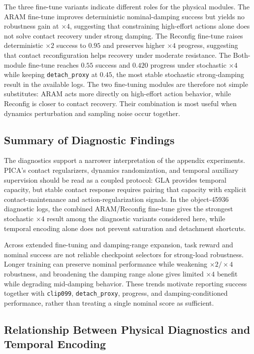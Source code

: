The three fine-tune variants indicate different roles for the physical
modules. The ARAM fine-tune improves deterministic nominal-damping
success but yields no robustness gain at $\times4$, suggesting that
constraining high-effort actions alone does not solve contact
recovery under strong damping. The Reconfig fine-tune raises
deterministic $\times2$ success to $0.95$ and preserves higher $\times4$
progress, suggesting that contact reconfiguration helps recovery
under moderate resistance. The Both-module fine-tune reaches $0.55$
success and $0.420$ progress under stochastic $\times4$ while keeping
\texttt{detach\_proxy} at $0.45$, the most stable stochastic
strong-damping result in the available logs. The two fine-tuning
modules are therefore not simple substitutes: ARAM acts more
directly on high-effort action behavior, while Reconfig is closer to
contact recovery. Their combination is most useful when dynamics
perturbation and sampling noise occur together.



\subsection{Summary of Diagnostic Findings}
\label{sec:findings}

The diagnostics support a narrower interpretation of the appendix
experiments. PICA's contact regularizers, dynamics randomization, and
temporal auxiliary supervision should be read as a coupled protocol:
GLA provides temporal capacity, but stable contact response requires
pairing that capacity with explicit contact-maintenance and
action-regularization signals. In the object-45936 diagnostic logs,
the combined ARAM/Reconfig fine-tune gives the strongest stochastic
$\times4$ result among the diagnostic variants considered here, while
temporal encoding alone does not prevent saturation and detachment
shortcuts.

Across extended fine-tuning and damping-range expansion, task reward
and nominal success are not reliable checkpoint selectors for
strong-load robustness. Longer training can preserve nominal
performance while weakening $\times2/\times4$ robustness, and
broadening the damping range alone gives limited $\times4$ benefit
while degrading mid-damping behavior. These trends motivate reporting
success together with \texttt{clip099}, \texttt{detach\_proxy},
progress, and damping-conditioned performance, rather than treating a
single nominal score as sufficient.


\subsection{Relationship Between Physical Diagnostics and Temporal
Encoding}
\label{sec:phys-temp}

